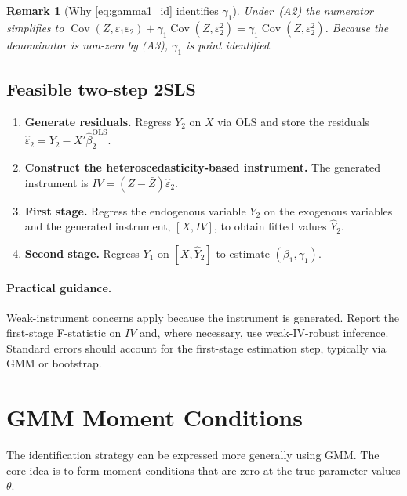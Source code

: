 \documentclass{article}
\newcommand{\cov}{\operatorname{Cov}}
\theoremstyle{plain}
\newtheorem{remark}{Remark}
\begin{document}
\begin{remark}[Why \eqref{eq:gamma1_id} identifies $\gamma_1$]
Under~(A2) the numerator simplifies to
\(\cov(Z,\varepsilon_1\varepsilon_2)+\gamma_1\cov(Z,\varepsilon_2^2)
    =\gamma_1\cov(Z,\varepsilon_2^2)\).
Because the denominator is non-zero by (A3),
\(\gamma_1\) is point identified.
\end{remark}

\subsection{Feasible two-step 2SLS}

\begin{enumerate}\itemsep2pt
\item \textbf{Generate residuals.}
      Regress \(Y_2\) on \(X\) via OLS and store the residuals
      $\hat\varepsilon_2 = Y_2 - X'\hat\beta_2^{\text{OLS}}$.

\item \textbf{Construct the heteroscedasticity-based instrument.}
      The generated instrument is \(IV = (Z-\bar Z)\hat\varepsilon_2\).

\item \textbf{First stage.} Regress the endogenous variable \(Y_2\) on the exogenous variables and the generated instrument, $[X, IV]$, to obtain fitted values \(\hat Y_2\).

\item \textbf{Second stage.} Regress \(Y_1\) on $[X,\hat Y_2]$
      to estimate \((\beta_1,\gamma_1)\).
\end{enumerate}

\paragraph{Practical guidance.}
Weak-instrument concerns apply because the instrument is generated.
Report the first-stage F-statistic on $IV$ and, where necessary,
use weak-IV-robust inference. Standard errors should account for the first-stage estimation step, typically via GMM or bootstrap.

\section{GMM Moment Conditions}

The identification strategy can be expressed more generally using GMM. The core idea is to form moment conditions that are zero at the true parameter values \(\theta\).
\end{document}

